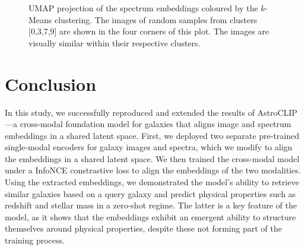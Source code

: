 \documentclass[a4paper,12pt]{article}
\begin{document}
\begin{figure}[H]
    \centering
    \caption{UMAP projection of the spectrum embeddings coloured by the $k$-Means clustering. The images of random samples from clusters [0,3,7,9] are shown in the four corners of this plot. The images are visually similar within their respective clusters.}
    \label{fig:annotated_images}

    
\end{figure}




\section{Conclusion}
In this study, we successfully reproduced and extended the results of AstroCLIP—a cross-modal foundation model for galaxies that aligns image and spectrum embeddings in a shared latent space. First, we deployed two separate pre-trained single-modal encoders for galaxy images and spectra, which we modify to align the embeddings in a shared latent space. We then trained the cross-modal model under a InfoNCE constrastive loss to align the embeddings of the two modalities. Using the extracted embeddings, we demonstrated the model's ability to retrieve similar galaxies based on a query galaxy and predict physical properties such as redshift and stellar mass in a zero-shot regime. The latter is a key feature of the model, as it shows that the embeddings exhibit an emergent ability to structure themselves around physical properties, despite these not forming part of the training process.
\end{document}
